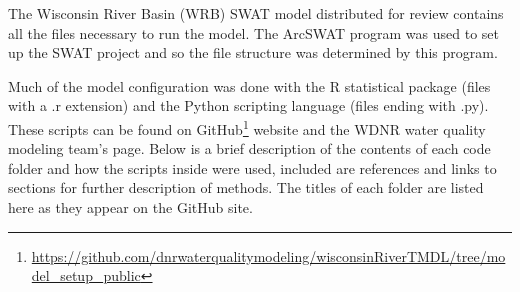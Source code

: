 \label{sec:model_data}
The Wisconsin River Basin (WRB) SWAT model distributed for review contains all the files necessary to run the model. The ArcSWAT program was used to set up the SWAT project and so the file structure was determined by this program. 

Much of the model configuration was done with the R statistical package (files with a .r extension) and the Python scripting language (files ending with .py). These scripts can be found on GitHub\footnote{\url{https://github.com/dnrwaterqualitymodeling/wisconsinRiverTMDL/tree/model_setup_public}} website and the WDNR water quality modeling team's page. Below is a brief description of the contents of each code folder and how the scripts inside were used, included are references and links to sections for further description of methods. The titles of each folder are listed here as they appear on the GitHub site.

